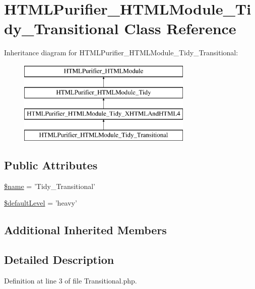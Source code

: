 \hypertarget{classHTMLPurifier__HTMLModule__Tidy__Transitional}{\section{H\+T\+M\+L\+Purifier\+\_\+\+H\+T\+M\+L\+Module\+\_\+\+Tidy\+\_\+\+Transitional Class Reference}
\label{classHTMLPurifier__HTMLModule__Tidy__Transitional}
}
Inheritance diagram for H\+T\+M\+L\+Purifier\+\_\+\+H\+T\+M\+L\+Module\+\_\+\+Tidy\+\_\+\+Transitional\+:\begin{figure}[H]
\begin{center}
\leavevmode
\includegraphics[height=4.000000cm]{classHTMLPurifier__HTMLModule__Tidy__Transitional}
\end{center}
\end{figure}
\subsection*{Public Attributes}
\begin{DoxyCompactItemize}
\item 
\hyperlink{classHTMLPurifier__HTMLModule__Tidy__Transitional_ad0ff9fac768c3cf2ec88f7d8828a774a}{\$name} = 'Tidy\+\_\+\+Transitional'
\item 
\hyperlink{classHTMLPurifier__HTMLModule__Tidy__Transitional_a510405d2fc5b924b1360306210a1e768}{\$default\+Level} = 'heavy'
\end{DoxyCompactItemize}
\subsection*{Additional Inherited Members}


\subsection{Detailed Description}


Definition at line 3 of file Transitional.\+php.



